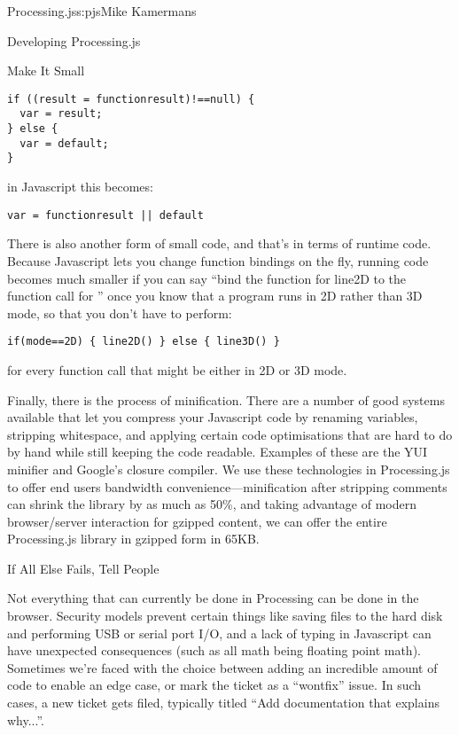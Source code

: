 \begin{aosachapter}{Processing.js}{s:pjs}{Mike Kamermans}
\begin{aosasect1}{Developing Processing.js}
\begin{aosasect2}{Make It Small}
\begin{verbatim}
if ((result = functionresult)!==null) {
  var = result;
} else {
  var = default;
}
\end{verbatim}

\noindent in Javascript this becomes:

\begin{verbatim}
var = functionresult || default
\end{verbatim}

There is also another form of small code, and that's in terms of
runtime code. Because Javascript lets you change function bindings on
the fly, running code becomes much smaller if you can say ``bind the
function for line2D to the function call for '' once you
know that a program runs in 2D rather than 3D mode, so that you don't
have to perform:

\begin{verbatim}
if(mode==2D) { line2D() } else { line3D() }
\end{verbatim}

\noindent
for every function call that might be either in 2D or 3D mode.

Finally, there is the process of minification. There are a number of
good systems available that let you compress your Javascript code by
renaming variables, stripping whitespace, and applying certain code
optimisations that are hard to do by hand while still keeping the code
readable. Examples of these are the YUI minifier and Google's closure
compiler. We use these technologies in Processing.js to offer end
users bandwidth convenience---minification after stripping comments
can shrink the library by as much as 50\%, and taking advantage of
modern browser/server interaction for gzipped content, we can offer
the entire Processing.js library in gzipped form in 65KB.

\end{aosasect2}

\begin{aosasect2}{If All Else Fails, Tell People}

Not everything that can currently be done in Processing can be done in
the browser. Security models prevent certain things like saving files
to the hard disk and performing USB or serial port I/O, and a lack of
typing in Javascript can have unexpected consequences (such as all
math being floating point math). Sometimes we're faced with the choice
between adding an incredible amount of code to enable an edge case, or
mark the ticket as a ``wontfix'' issue. In such cases, a new ticket gets
filed, typically titled ``Add documentation that explains why...''.


\end{aosasect2}
\end{aosasect1}
\end{aosachapter}
